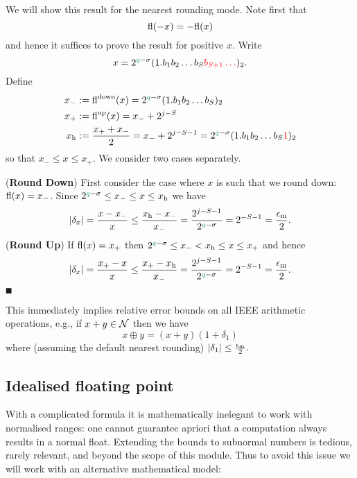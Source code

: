We will show this result for the nearest rounding mode. Note first that
\[
{\rm fl}(-x) = -{\rm fl}(x)
\]
and hence it suffices to prove the result for positive $x$. Write
\[
x = 2^{\green{q}-\ensuremath{\sigma}} (1.b_1b_2\ensuremath{\ldots}b_S\red{b_{S+1}\ensuremath{\ldots}})_2.
\]
Define
\begin{align*}
x_- &:= {\rm fl}^{\rm down}(x) = 2^{\green{q}-\ensuremath{\sigma}} (1.b_1b_2\ensuremath{\ldots}b_S)_2 \\
x_+ &:= {\rm fl}^{\rm up}(x) = x_- + 2^{j-S} \\
x_{\rm h} &:= {x_+ + x_- \over 2} = x_- + 2^{j-S-1} = 2^{\green{q}-\ensuremath{\sigma}} (1.b_1b_2\ensuremath{\ldots}b_S\red{1})_2
\end{align*}
so that $x_- \ensuremath{\leq} x \ensuremath{\leq} x_+$. We consider two cases separately.

(\textbf{Round Down}) First consider the case where $x$ is such that we round down: ${\rm fl}(x) = x_-$. Since $2^{\green{q}-\ensuremath{\sigma}} \ensuremath{\leq} x_- \ensuremath{\leq} x \ensuremath{\leq} x_{\rm h}$ we have
\[
|\ensuremath{\delta}_x| = {x - x_- \over x} \ensuremath{\leq} {x_{\rm h} - x_- \over x_-} = {2^{j-S-1} \over 2^{\green{q}-\ensuremath{\sigma}}} = 2^{-S-1} = {\ensuremath{\epsilon}_{\rm m} \over 2}.
\]
(\textbf{Round Up}) If ${\rm fl}(x) = x_+$ then $2^{\green{q}-\ensuremath{\sigma}} \ensuremath{\leq} x_- < x_{\rm h} \ensuremath{\leq} x \ensuremath{\leq} x_+$ and hence
\[
|\ensuremath{\delta}_x| = {x_+ - x \over x} \ensuremath{\leq} {x_+ - x_{\rm h} \over x_-} = {2^{j-S-1} \over 2^{\green{q}-\ensuremath{\sigma}}} = 2^{-S-1} = {\ensuremath{\epsilon}_{\rm m} \over 2}.
\]
\ensuremath{\QED}

This immediately implies relative error bounds on all IEEE arithmetic operations, e.g., if $x+y \in {\cal N}$ then we have
\[
x \ensuremath{\oplus} y = (x+y) (1 + \ensuremath{\delta}_1)
\]
where (assuming the default nearest rounding) $|\ensuremath{\delta}_1| \ensuremath{\leq} {\ensuremath{\epsilon}_{\rm m} \over 2}.$

\subsection{Idealised floating point}
With a complicated formula it is mathematically inelegant to work with normalised ranges: one cannot guarantee apriori that a computation always results in a normal float. Extending the bounds to subnormal numbers is tedious, rarely relevant, and beyond the scope of this module. Thus to avoid this issue we will work with an alternative mathematical model:

